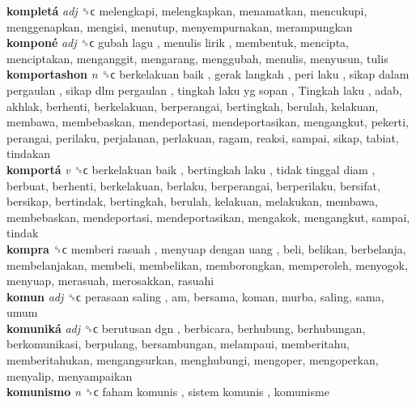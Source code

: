 \textbf{kompletá} \emph{adj}  ␝ϲ  melengkapi, melengkapkan, menamatkan, mencukupi, menggenapkan, mengisi, menutup, menyempurnakan, merampungkan  \\
\textbf{komponé} \emph{adj}  ␝ϲ   gubah lagu ,  menulis lirik , membentuk, mencipta, menciptakan, menganggit, mengarang, menggubah, menulis, menyusun, tulis  \\
\textbf{komportashon} \emph{n}  ␝ϲ   berkelakuan baik ,  gerak langkah ,  peri laku ,  sikap dalam pergaulan ,  sikap dlm pergaulan ,  tingkah laku yg sopan ,  Tingkah laku , adab, akhlak, berhenti, berkelakuan, berperangai, bertingkah, berulah, kelakuan, membawa, membebaskan, mendeportasi, mendeportasikan, mengangkut, pekerti, perangai, perilaku, perjalanan, perlakuan, ragam, reaksi, sampai, sikap, tabiat, tindakan  \\
\textbf{komportá} \emph{v}  ␝ϲ   berkelakuan baik ,  bertingkah laku ,  tidak tinggal diam , berbuat, berhenti, berkelakuan, berlaku, berperangai, berperilaku, bersifat, bersikap, bertindak, bertingkah, berulah, kelakuan, melakukan, membawa, membebaskan, mendeportasi, mendeportasikan, mengakok, mengangkut, sampai, tindak  \\
\textbf{kompra} ␝ϲ   memberi rasuah ,  menyuap dengan uang , beli, belikan, berbelanja, membelanjakan, membeli, membelikan, memborongkan, memperoleh, menyogok, menyuap, merasuah, merosakkan, rasuahi  \\
\textbf{komun} \emph{adj}  ␝ϲ   perasaan saling , am, bersama, koman, murba, saling, sama, umum  \\
\textbf{komuniká} \emph{adj}  ␝ϲ   berutusan dgn , berbicara, berhubung, berhubungan, berkomunikasi, berpulang, bersambungan, melampaui, memberitahu, memberitahukan, mengangsurkan, menghubungi, mengoper, mengoperkan, menyalip, menyampaikan  \\
\textbf{komunismo} \emph{n}  ␝ϲ   faham komunis ,  sistem komunis , komunisme  \\
